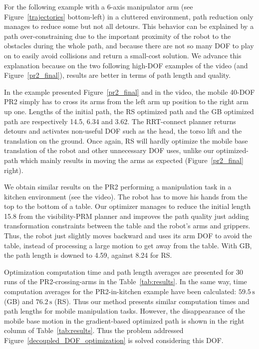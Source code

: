 \documentclass{tADR2e}
\begin{document}
For the following example with a 6-axis manipulator arm (see Figure~\ref{trajectories} bottom-left)
in a  cluttered environment, path reduction only manages to reduce some but not 
all detours. This behavior can be explained by a path over-constraining due to the 
important proximity of the robot to the obstacles during the whole path, and 
because there are not so many DOF to play on to easily avoid collisions and 
return a small-cost solution.
We advance this explanation because on the two following high-DOF examples of the 
video (and Figure~\ref{pr2_final}), results are better 
in terms of path length and quality.



In the example presented Figure~\ref{pr2_final} and in the video, the mobile 
40-DOF PR2 simply has to cross its arms from 
the left arm up position to the right arm up one. Lengths of the initial path, the 
RS optimized path and the GB optimized path are 
respectively 14.5, 6.34 and 3.62. The RRT-connect planner 
returns detours and activates non-useful DOF such as the head, the torso lift 
and the translation on 
the ground. Once again, RS will hardly optimize the mobile base 
translation of the robot and other unnecessary DOF uses, unlike our 
optimized-path which mainly results in moving the arms as expected 
(Figure~\ref{pr2_final} right).

We obtain similar results on the PR2 performing a manipulation task 
in a kitchen environment (see the video). The robot has to move 
his hands from the top to the bottom of a table.
Our optimizer manages to reduce the initial length 15.8 from the visibility-PRM 
planner and improves the path quality 
just adding transformation constraints between the table and the 
robot's arms and grippers. Thus, the robot just slightly moves 
backward and uses its arm DOF to avoid the table, instead of 
processing a large motion to get away from the table. With GB, the path length is downed to 4.59, against 8.24 for RS.

Optimization computation time and path length averages are presented for 30 runs of 
the PR2-crossing-arms in the Table~\ref{tab:results}. In the same way, time 
computation averages for the PR2-in-kitchen example have been 
calculated: $59.5\,\text{s}$ (GB) and $76.2\,\text{s}$ (RS).
Thus our method presents 
similar computation times and path lengths for mobile manipulation tasks. However, 
the disappearance of the mobile base motion in the gradient-based optimized path is 
shown in the right column of Table~\ref{tab:results}. Thus the problem addressed 
Figure~\ref{decoupled_DOF_optimization} is solved considering this DOF.
\end{document}
